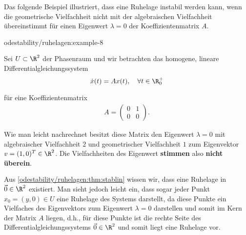 \documentclass[letterpaper,10pt,german]{jupyterBook}
\begin{document}
\par
Das folgende Beispiel illustriert, dass eine Ruhelage instabil werden kann, wenn die geometrische Vielfachheit nicht mit der algebraischen Vielfachheit übereinstimmt für einen Eigenwert \(\lambda =0\) der Koeffizientenmatrix \(A\).
\begin{example}{}{odestability/ruhelagen:example-8}



\par
Sei \(U \subset \R^2\) der Phasenraum und wir betrachten das homogene, lineare Differentialgleichungssystem
\begin{align*}
\dot{x}(t) = A x(t), \quad \forall t \in \R_0^+
\end{align*}
\par
für eine Koeffizientenmatrix
\begin{align*}
A = \begin{pmatrix} 0&1\\0&0\end{pmatrix}.
\end{align*}
\par
Wie man leicht nachrechnet besitzt diese Matrix den Eigenwert \(\lambda = 0\) mit algebraischer Vielfachheit \(2\) und geometrischer Vielfachheit \(1\) zum Eigenvektor \(v = (1,0)^T \in \R^2\).
Die Vielfachheiten des Eigenwert \textbf{stimmen} also \textbf{nicht überein}.

\par
Aus \cref{odestability/ruhelagen:thm:stablin} wissen wir, dass eine Ruhelage in \(\vec{0} \in \R^2\) existiert.
Man sieht jedoch leicht ein, dass sogar jeder Punkt \(x_0 = (y, 0) \in U\) eine Ruhelage des Systems darstellt, da diese Punkte ein Vielfaches des Eigenvektors zum Eigenwert \(\lambda = 0\) darstellen und somit im Kern der Matrix \(A\) liegen, d.h., für diese Punkte ist die rechte Seite des Differentialgleichungssystems \(\vec{0} \in \R^2\) und somit liegt eine Ruhelage vor.


\end{example}
\end{document}
